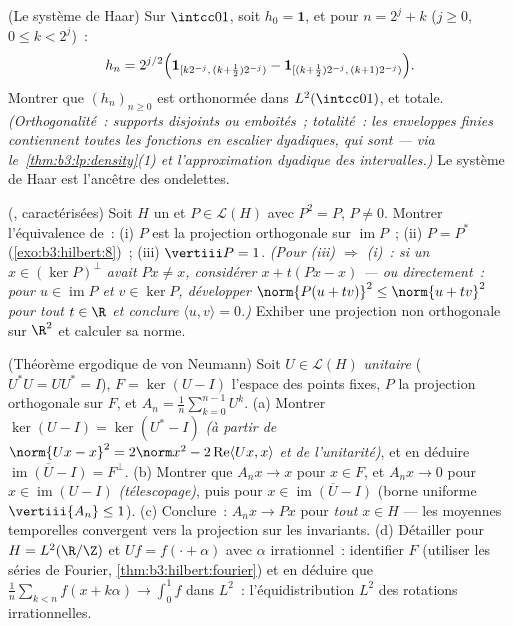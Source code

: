 \begin{exercise}[$\star\star\star$]\label{exo:b3:hilbert:10}
(Le système de Haar) Sur $\intcc01$, soit $h_{0} = \mathbf 1$,
et pour $n = 2^j + k$ ($j \geq 0$, $0 \leq k < 2^j$)~:
\[
h_n = 2^{j/2}\Bigl(\mathbf 1_{[k2^{-j},\,(k +
\frac12)2^{-j})} - \mathbf 1_{[(k+\frac12)2^{-j},\,(k+1)2^{-j})}
\Bigr).
\]
Montrer que $(h_n)_{n\geq0}$ est orthonormée dans
$L^2(\intcc01)$, et totale. \emph{(Orthogonalité~: supports
disjoints ou emboîtés~; totalité~: les enveloppes finies
contiennent toutes les fonctions en escalier dyadiques, qui
sont  --- via le~\cref{thm:b3:lp:density}(1) et
l'approximation dyadique des intervalles.)} Le système de Haar
est l'ancêtre des ondelettes.
\end{exercise}

\begin{exercise}[$\star\star$]\label{exo:b3:hilbert:11}
(, caractérisées) Soit $H$ un  et $P \in \mathcal L(H)$ avec $P^2 = P$, $P \neq
0$. Montrer l'équivalence de~:
(i) $P$ est la projection orthogonale sur
$\operatorname{im}P$~;
(ii) $P = P^*$ (\cref{exo:b3:hilbert:8})~;
(iii) $\vertiii P = 1$.
\emph{(Pour (iii) $\Rightarrow$ (i)~: si un $x \in
(\ker P)^\perp$ avait $Px \neq x$, considérer $x + t(Px - x)$
--- ou directement~: pour $u \in \operatorname{im}P$ et $v
\in \ker P$, développer $\norm{P(u + tv)}^2 \leq \norm{u +
tv}^2$ pour tout $t \in \R$ et conclure $\langle u, v\rangle
= 0$.)} Exhiber une projection non orthogonale sur $\R^2$ et
calculer sa norme.
\end{exercise}

\begin{exercise}[$\star\star\star$]\label{exo:b3:hilbert:12}
(Théorème ergodique de von Neumann) Soit $U \in \mathcal L(H)$
\emph{unitaire} ($U^*U = UU^* = I$), $F = \ker(U - I)$
l'espace des points fixes, $P$ la projection orthogonale sur
$F$, et $A_n = \frac1n\sum_{k=0}^{n-1}U^k$.
(a) Montrer $\ker(U - I) = \ker(U^* - I)$ \emph{(à partir de
$\norm{Ux - x}^2 = 2\norm x^2 - 2\operatorname{Re}\langle
Ux, x\rangle$ et de l'unitarité)}, et en déduire
$\overline{\operatorname{im}(U - I)} = F^\perp$.
(b) Montrer que $A_nx \to x$ pour $x \in F$, et $A_nx \to 0$
pour $x \in \operatorname{im}(U - I)$ \emph{(télescopage)},
puis pour $x \in \overline{\operatorname{im}(U - I)}$
(borne uniforme $\vertiii{A_n} \leq 1$).
(c) Conclure~: $A_nx \to Px$ pour \emph{tout} $x \in H$ ---
les moyennes temporelles convergent vers la projection sur
les invariants.
(d) Détailler pour $H = L^2(\R/\Z)$ et $Uf = f(\cdot +
\alpha)$ avec $\alpha$ irrationnel~: identifier $F$ (utiliser
les séries de Fourier, \cref{thm:b3:hilbert:fourier}) et en
déduire que $\frac1n\sum_{k<n}f(x + k\alpha) \to \int_0^1f$
dans $L^2$~: l'équidistribution $L^2$ des rotations
irrationnelles.
\end{exercise}

